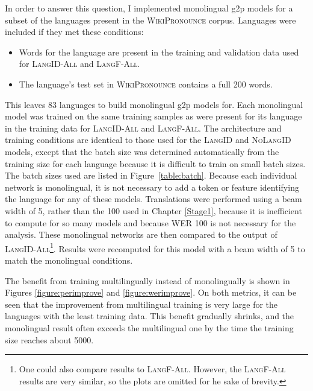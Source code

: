 In order to answer this question, I implemented monolingual g2p models for a subset of the languages present in the \textsc{WikiPronounce} corpus. Languages were included if they met these conditions:

\begin{itemize}
\item Words for the language are present in the training and validation data used for \textsc{LangID-All} and \textsc{LangF-All}.
\item The language's test set in \textsc{WikiPronounce} contains a full 200 words.
\end{itemize}

This leaves 83 languages to build monolingual g2p models for. Each monolingual model was trained on the same training samples as were present for its language in the training data for \textsc{LangID-All} and \textsc{LangF-All}. The architecture and training conditions are identical to those used for the \textsc{LangID} and \textsc{NoLangID} models, except that the batch size was determined automatically from the training size for each language because it is difficult to train on small batch sizes. The batch sizes used are listed in Figure~\ref{table:batch}. Because each individual network is monolingual, it is not necessary to add a token or feature identifying the language for any of these models. Translations were performed using a beam width of 5, rather than the 100 used in Chapter \ref{Stage1}, because it is inefficient to compute for so many models and because WER 100 is not necessary for the analysis. These monolingual networks are then compared to the output of \textsc{LangID-All}\footnote{One could also compare results to \textsc{LangF-All}. However, the \textsc{LangF-All} results are very similar, so the plots are omitted for he sake of brevity.}. Results were recomputed for this model with a beam width of 5 to match the monolingual conditions.

The benefit from training multilingually instead of monolingually is shown in Figures \ref{figure:perimprove} and \ref{figure:werimprove}. On both metrics, it can be seen that the improvement from multilingual training is very large for the languages with the least training data. This benefit gradually shrinks, and the monolingual result often exceeds the multilingual one by the time the training size reaches about 5000.

